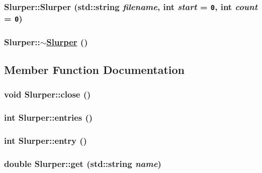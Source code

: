 \hypertarget{classSlurper_a1}{
\subsubsection[Slurper]{\setlength{\rightskip}{0pt plus 5cm}Slurper::Slurper (std::string {\em filename}, int {\em start} = {\tt 0}, int {\em count} = {\tt 0})}}
\label{classSlurper_a1}


\hypertarget{classSlurper_a2}{
\subsubsection[$\sim$Slurper]{\setlength{\rightskip}{0pt plus 5cm}Slurper::$\sim$\hyperlink{classSlurper}{Slurper} ()}}
\label{classSlurper_a2}




\subsection{Member Function Documentation}
\hypertarget{classSlurper_a4}{
\subsubsection[close]{\setlength{\rightskip}{0pt plus 5cm}void Slurper::close ()}}
\label{classSlurper_a4}


\hypertarget{classSlurper_a9}{
\subsubsection[entries]{\setlength{\rightskip}{0pt plus 5cm}int Slurper::entries ()}}
\label{classSlurper_a9}


\hypertarget{classSlurper_a6}{
\subsubsection[entry]{\setlength{\rightskip}{0pt plus 5cm}int Slurper::entry ()}}
\label{classSlurper_a6}


\hypertarget{classSlurper_a7}{
\subsubsection[get]{\setlength{\rightskip}{0pt plus 5cm}double Slurper::get (std::string {\em name})}}
\label{classSlurper_a7}


